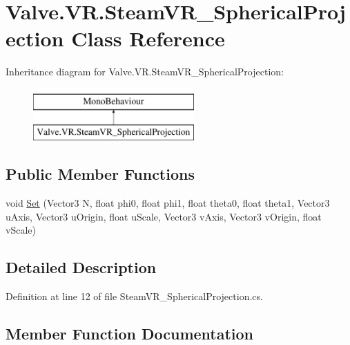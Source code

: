 \hypertarget{class_valve_1_1_v_r_1_1_steam_v_r___spherical_projection}{}\section{Valve.\+V\+R.\+Steam\+V\+R\+\_\+\+Spherical\+Projection Class Reference}
\label{class_valve_1_1_v_r_1_1_steam_v_r___spherical_projection}
Inheritance diagram for Valve.\+V\+R.\+Steam\+V\+R\+\_\+\+Spherical\+Projection\+:\begin{figure}[H]
\begin{center}
\leavevmode
\includegraphics[height=2.000000cm]{class_valve_1_1_v_r_1_1_steam_v_r___spherical_projection}
\end{center}
\end{figure}
\subsection*{Public Member Functions}
\begin{DoxyCompactItemize}
\item 
void \mbox{\hyperlink{class_valve_1_1_v_r_1_1_steam_v_r___spherical_projection_a4e5bb05db62e8cf84e24485f0f7e489b}{Set}} (Vector3 N, float phi0, float phi1, float theta0, float theta1, Vector3 u\+Axis, Vector3 u\+Origin, float u\+Scale, Vector3 v\+Axis, Vector3 v\+Origin, float v\+Scale)
\end{DoxyCompactItemize}


\subsection{Detailed Description}


Definition at line 12 of file Steam\+V\+R\+\_\+\+Spherical\+Projection.\+cs.



\subsection{Member Function Documentation}
\mbox{\label{class_valve_1_1_v_r_1_1_steam_v_r___spherical_projection_a4e5bb05db62e8cf84e24485f0f7e489b}} 
